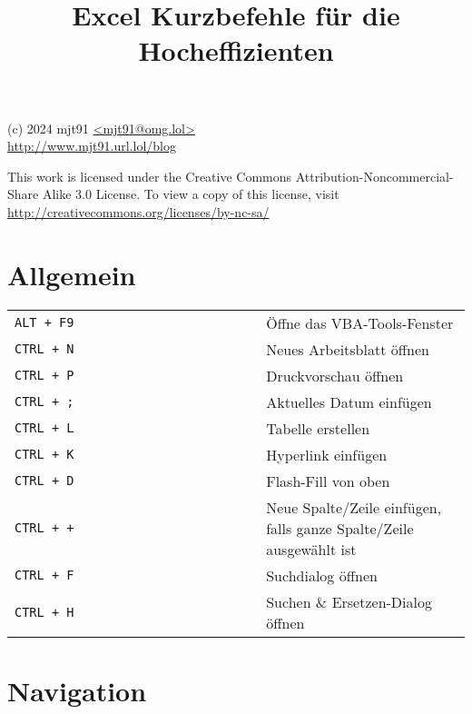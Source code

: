 \documentclass[8pt]{extarticle} %
\begin{document}
\raggedright

\begin{multicols}{2}

\title{Excel Kurzbefehle für die Hocheffizienten}

{\small
(c) 2024 mjt91 \url{<mjt91@omg.lol>}\\
\url{http://www.mjt91.url.lol/blog}

This work is licensed under the Creative Commons Attribution-Noncommercial-Share
Alike 3.0 License. To view a copy of this license, visit
\url{http://creativecommons.org/licenses/by-nc-sa/}
}

\vspace*{1pt}

\section{Allgemein}

  \vspace{1ex}
  \begin{tabular}{L{0.55\linewidth} L{0.45\linewidth}}

    \tt ALT + F9                & \"Offne das VBA-Tools-Fenster \\
    \tt CTRL + N                & Neues Arbeitsblatt öffnen \\
    \tt CTRL + P                & Druckvorschau öffnen \\
    \tt CTRL + ;                & Aktuelles Datum einfügen \\
    \tt CTRL + L                & Tabelle erstellen \\
    \tt CTRL + K                & Hyperlink einfügen \\
    \tt CTRL + D                & Flash-Fill von oben \\
    \tt CTRL + +                & Neue Spalte/Zeile einfügen, falls ganze Spalte/Zeile ausgewählt ist \\
    \tt CTRL + F                & Suchdialog öffnen \\
    \tt CTRL + H                & Suchen \& Ersetzen-Dialog öffnen \\

  \end{tabular}
  
\section{Navigation}


\end{multicols}
\end{document}
